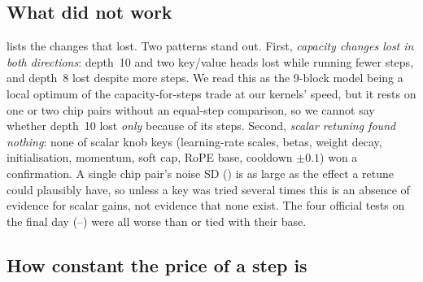 \subsection{What did not work}
\label{sec:negative}

 lists the changes that lost. Two patterns stand out. First, \emph{capacity changes lost in both
directions}: depth~10 and two key/value heads lost while running \docnum{} fewer steps, and depth~8
lost despite \docnum{} more steps. We read this as the 9-block model being a local optimum of the
capacity-for-steps trade at our kernels' speed, but it rests on one or two chip pairs without an equal-step comparison,
so we cannot say whether depth~10 lost \emph{only} because of its steps. Second, \emph{scalar retuning found
nothing}: none of \docnum{} scalar knob keys (learning-rate scales, betas, weight decay,
initialisation, momentum, soft cap, RoPE base, cooldown $\pm0.1$) won a confirmation. A single chip pair's noise SD
() is as large as the effect a retune could plausibly have, so unless a key was tried several
times this is an absence of evidence for scalar gains, not evidence that none exist. The four official tests on the final day
(--) were all worse than or tied with their base.

\begin{table}[!htbp]
  \centering
  \caption{\textbf{What lost.} $\Delta$ against the control (positive is worse); evidence as in \cref{tab:levers}.
    Official deltas are against . \textsuperscript{\S}\,May have re-rolled the warm-up path; its step-10 loss
    was not logged (\cref{sec:seeds}). Source: \texttt{docs/FINDINGS.md} \S5\docnum{} and
    \texttt{results/official-scores.csv}.}
  \label{tab:negative}
  
\end{table}

\subsection{How constant the price of a step is}
\label{app:kappa}

